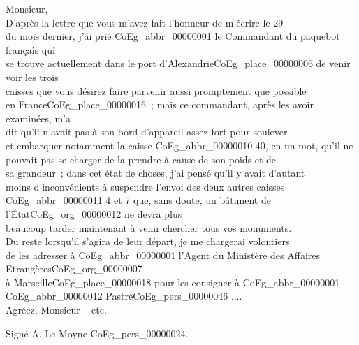 \documentclass{book}
\begin{document}
\hspace{1cm} Monsieur,\\

\indent D’après la lettre que vous m’avez fait l’honneur de m’écrire le 29\\
du mois dernier, j’ai prié \gls{CoEg_abbr_00000001} le Commandant du paquebot français qui\\
se trouve actuellement dans le port d’Alexandrie\gls{CoEg_place_00000006} de venir voir les trois\\
caisses que vous désirez faire parvenir aussi promptement que possible\\
en France\gls{CoEg_place_00000016}~; mais ce commandant, après les avoir examinées, m’a\\
dit qu’il n’avait pas à son bord d’appareil assez fort pour soulever\\
et embarquer notamment la caisse \gls{CoEg_abbr_00000010} 40, en un mot, qu’il ne\\
pouvait pas se charger de la prendre à cause de son poids et de\\
sa grandeur~; dans cet état de choses, j’ai pensé qu’il y avait d’autant\\
moins d’inconvénients à suspendre l’envoi des deux autres caisses\\
\gls{CoEg_abbr_00000011} 4 et 7 que, sans doute, un bâtiment de l’État\gls{CoEg_org_00000012} ne devra plus\\
beaucoup tarder maintenant à venir chercher tous vos monuments.\\
Du reste lorsqu’il s’agira de leur départ, je me chargerai volontiers\\
de les adresser à \gls{CoEg_abbr_00000001} l’Agent du Ministère des Affaires Etrangères\gls{CoEg_org_00000007}\\
à Marseille\gls{CoEg_place_00000018} pour les consigner à \gls{CoEg_abbr_00000001} \gls{CoEg_abbr_00000012} Pastré\gls{CoEg_pers_00000046} ....\\
\indent Agréez, Monsieur – etc.
\begin{center} \hspace{5cm} Signé A. Le Moyne \gls{CoEg_pers_00000024}.\end{center}
\hypertarget{CoEg_Mariette_1852-09-03}{}
\end{document}
